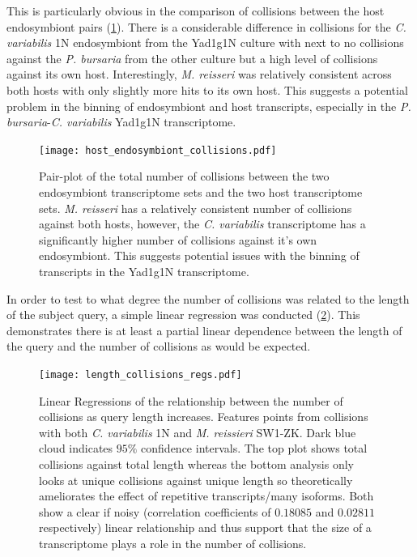 This is particularly obvious in 
the comparison of collisions between the host endosymbiont pairs
(\cref{fig:pairs_endo}).  There is a considerable difference
in collisions for the \textit{C. variabilis} 1N endosymbiont
from the Yad1g1N culture with next to no collisions
against the \textit{P. bursaria} from the other culture
but a high level of collisions against its own host.
Interestingly, \textit{M. reisseri} was relatively
consistent across both hosts with only slightly more
hits to its own host. 
This suggests a potential problem
in the binning of endosymbiont and host transcripts, especially
in the \textit{P. bursaria}-\textit{C. variabilis} Yad1g1N transcriptome.

\begin{figure}
    \centering
    \texttt{[image: host\_endosymbiont\_collisions.pdf]}
    \caption[Pair-plot of collisions in host-endosymbiont pairs]
    {Pair-plot of the total number of collisions between
        the two endosymbiont transcriptome sets and 
        the two host transcriptome sets. \textit{M. reisseri}
        has a relatively consistent number of collisions
        against both hosts, however, the \textit{C. variabilis}
        transcriptome has a significantly higher number
        of collisions against it's own endosymbiont.
        This suggests potential issues with the binning
    of transcripts in the Yad1g1N transcriptome.}
    \label{fig:pairs_endo}
\end{figure}


In order to test to what degree the number of collisions was related
to the length of the subject query, a simple linear regression
was conducted (\cref{fig:edicer_collisions_by_length}).  
This demonstrates there is at least a partial linear dependence between the 
length of the query and the number of collisions as would be expected.

\begin{figure}
    \centering
    \texttt{[image: length\_collisions\_regs.pdf]}
    \caption[Regression of eDicer collisions by query length]{Linear Regressions
    of the relationship between the number of collisions as query length
increases. Features points from collisions with both \textit{C. variabilis} 1N
and \textit{M. reissieri} SW1-ZK.  Dark blue cloud indicates \(95\%\) confidence
intervals.  
The top plot shows total collisions against
total length whereas the bottom analysis only looks at unique collisions
against unique length so theoretically ameliorates the effect of repetitive 
transcripts/many isoforms.  Both show a clear if noisy (correlation coefficients
of \(0.18085\) and \(0.02811\) respectively) linear relationship and thus
support that the size of a transcriptome plays a role in the number of collisions.}
    \label{fig:edicer_collisions_by_length}
\end{figure}

